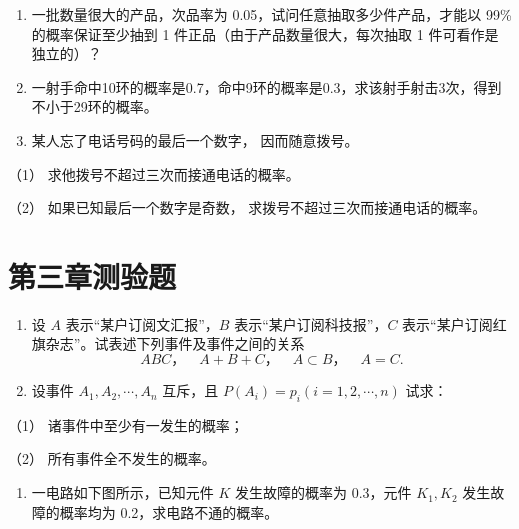 \begin{enumerate}[start=10]
\item
  一批数量很大的产品，次品率为 0.05，试问任意抽取多少件产品，才能以 99\%
  的概率保证至少抽到 1 件正品（由于产品数量很大，每次抽取 1
  件可看作是独立的）？
\item
  一射手命中10环的概率是0.7，命中9环的概率是0.3，求该射手射击3次，得到不小于29环的概率。
\item
  某人忘了电话号码的最后一个数字， 因而随意拨号。
\end{enumerate}

（1） 求他拨号不超过三次而接通电话的概率。

（2） 如果已知最后一个数字是奇数， 求拨号不超过三次而接通电话的概率。

\section{第三章测验题}

\begin{enumerate}
\item
  设 \(A\) 表示``某户订阅文汇报''，\(B\) 表示``某户订阅科技报''，\(C\)
  表示``某户订阅红旗杂志''。试表述下列事件及事件之间的关系
\[
A B C\text{，} \quad A + B + C\text{，} \quad A \subset B\text{，} \quad A = C.
\]
\item
  设事件 \(A_{1}, A_{2}, \cdots, A_{n}\) 互斥，且
  \(P(A_{i}) = p_{i} (i = 1, 2, \cdots, n)\) 试求：
\end{enumerate}

（1） 诸事件中至少有一发生的概率；

（2） 所有事件全不发生的概率。

\begin{enumerate}[start=3]
\item
  一电路如下图所示，已知元件 \(K\) 发生故障的概率为 0.3，元件
  \(K_{1}, K_{2}\) 发生故障的概率均为 0.2，求电路不通的概率。
\end{enumerate}

